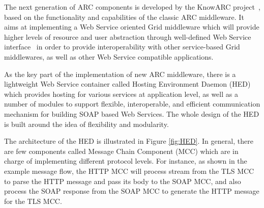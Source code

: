 \documentclass[conference]{IEEEtran}
\begin{document}
The next generation of ARC components is developed by the KnowARC project~\cite{KnowARClink}, based on the functionality and capabilities of the classic ARC middleware. It aims at implementing a Web Service oriented Grid middleware which will provide higher levels of resource and user abstraction through well-defined Web Service interface~\cite{KnowARCDesignlink} in order to provide interoperability with other service-based Grid middlewares, as well as other Web Service compatible applications.

As the key part of the implementation of new ARC middleware, there is a lightweight Web Service container called Hosting Environment Daemon (HED) which provides hosting for various services at application level, as well as a number of modules to support flexible, interoperable, and efficient communication mechanism for building SOAP based Web Services. The whole design of the HED is built around the idea of flexibility and modularity.

The architecture of the HED is illustrated in Figure \ref{fig:HED}. In general, there are few components called Message Chain Component (MCC) which are in charge of implementing different protocol levels. For instance, as shown in the example message flow, the HTTP MCC will process stream from the TLS MCC to parse the HTTP message and pass its body to the SOAP MCC, and also process the SOAP response from the SOAP MCC to generate the HTTP message for the TLS MCC.
\end{document}
